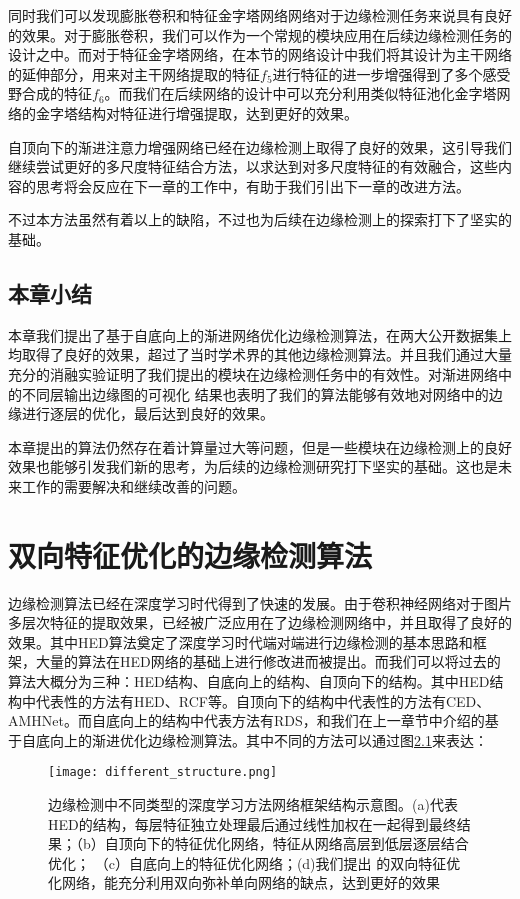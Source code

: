 \documentclass[master]{thesis-uestc}
\begin{document}
{同时我们可以发现膨胀卷积和特征金字塔网络网络对于边缘检测任务来说具有良好的效果。对于膨胀卷积，我们可以作为一个常规的模块应用在后续边缘检测任务的设计之中。而对于特征金字塔网络，在本节的网络设计中我们将其设计为主干网络的延伸部分，用来对主干网络提取的特征$f_5$进行特征的进一步增强得到了多个感受野合成的特征$f_6$。而我们在后续网络的设计中可以充分利用类似特征池化金字塔网络的金字塔结构对特征进行增强提取，达到更好的效果。

自顶向下的渐进注意力增强网络已经在边缘检测上取得了良好的效果，这引导我们继续尝试更好的多尺度特征结合方法，以求达到对多尺度特征的有效融合，这些内容的思考将会反应在下一章的工作中，有助于我们引出下一章的改进方法。

不过本方法虽然有着以上的缺陷，不过也为后续在边缘检测上的探索打下了坚实的基础。
\section{本章小结}
本章我们提出了基于自底向上的渐进网络优化边缘检测算法，在两大公开数据集上均取得了良好的效果，超过了当时学术界的其他边缘检测算法。并且我们通过大量充分的消融实验证明了我们提出的模块在边缘检测任务中的有效性。对渐进网络中的不同层输出边缘图的可视化 结果也表明了我们的算法能够有效地对网络中的边缘进行逐层的优化，最后达到良好的效果。

本章提出的算法仍然存在着计算量过大等问题，但是一些模块在边缘检测上的良好效果也能够引发我们新的思考，为后续的边缘检测研究打下坚实的基础。这也是未来工作的需要解决和继续改善的问题。




\chapter{双向特征优化的边缘检测算法}
边缘检测算法已经在深度学习时代得到了快速的发展。由于卷积神经网络对于图片多层次特征的提取效果，已经被广泛应用在了边缘检测网络中，并且取得了良好的效果。其中HED算法奠定了深度学习时代端对端进行边缘检测的基本思路和框架，大量的算法在HED网络的基础上进行修改进而被提出。而我们可以将过去的算法大概分为三种：HED结构、自底向上的结构、自顶向下的结构。其中HED结构中代表性的方法有HED、RCF等。自顶向下的结构中代表性的方法有CED、AMHNet。而自底向上的结构中代表方法有RDS，和我们在上一章节中介绍的基于自底向上的渐进优化边缘检测算法。其中不同的方法可以通过图\ref{different_structure}来表达：
\begin{figure}[h!]
    \texttt{[image: different\_structure.png]}
    \caption{边缘检测中不同类型的深度学习方法网络框架结构示意图。(a)代表HED的结构，每层特征独立处理最后通过线性加权在一起得到最终结果；（b）自顶向下的特征优化网络，特征从网络高层到低层逐层结合优化； （c）自底向上的特征优化网络；(d)我们提出 的双向特征优化网络，能充分利用双向弥补单向网络的缺点，达到更好的效果}
    \label{different_structure}
\end{figure}

}
\end{document}
